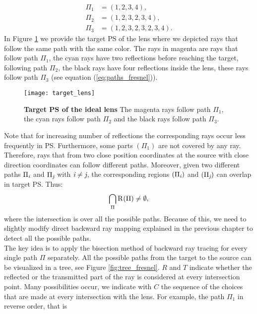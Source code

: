 \begin{equation}\label{eq:paths_fresnel}
\begin{aligned}
\Pi_1 & = (1,2,3,4),\\
\Pi_2 & = (1,2,3,2,3,4), \\
\Pi_3 & = (1,2,3,2,3,2,3,4).
\end{aligned}
\end{equation}
In Figure \ref{fig:target_PS_lens} we provide the target PS of the lens where we depicted rays that follow the same path with the same color. The rays in magenta are rays that follow path $\Pi_1$, the cyan rays have two reflections before reaching the target, following path $\Pi_2$, the black rays have four reflections inside the lens, these rays follow path $\Pi_3$ (see equation (\ref{eq:paths_fresnel})).
\begin{figure}[t]
  \begin{center}
  \texttt{[image: target\_lens]}
  \end{center}
  \caption{\textbf{Target PS of the ideal lens}
The magenta rays follow path $\Pi_1$, the cyan rays follow path $\Pi_2$ and the black rays follow path $\Pi_3$.}
\label{fig:target_PS_lens}
 \end{figure}
Note that for increasing number of reflections the corresponding rays occur less frequently in PS. Furthermore, some parts $(\Pi_1)$ are not covered by any ray. Therefore, rays that from two close position coordinates at the source with close direction coordinates can follow different paths. 
Moreover, given two different paths $\Pi_{\textit{i}}$ and $\Pi_{\textit{j}}$ with $\textit{i}\neq\textit{j}$, the corresponding regions $(\Pi_{\textit{i}})$ and $(\Pi_{\textit{j}})$ can overlap in target PS. Thus:
\begin{equation}
\bigcap_{\Pi}\mbox{$\textup{R}_{\textit{}}$}(\Pi)\neq \emptyset,
\end{equation}
where the intersection is over all the possible paths. 
Because of this, we need to slightly modify direct backward ray mapping explained in the previous chapter to detect all the possible paths. \\ \indent
The key idea is to apply the bisection method of backward ray tracing for every single path $\Pi$ separately. All the possible paths from the target to the source can be visualized in a tree, see Figure \ref{fig:tree_fresnel}. $R$ and $T$ indicate whether the reflected or the transmitted part of the ray is considered at every intersection point. Many possibilities occur, we indicate with $C$ the sequence of the choices that are made at every intersection with the lens. For example, the path $\Pi_1$ in reverse order, that is 

